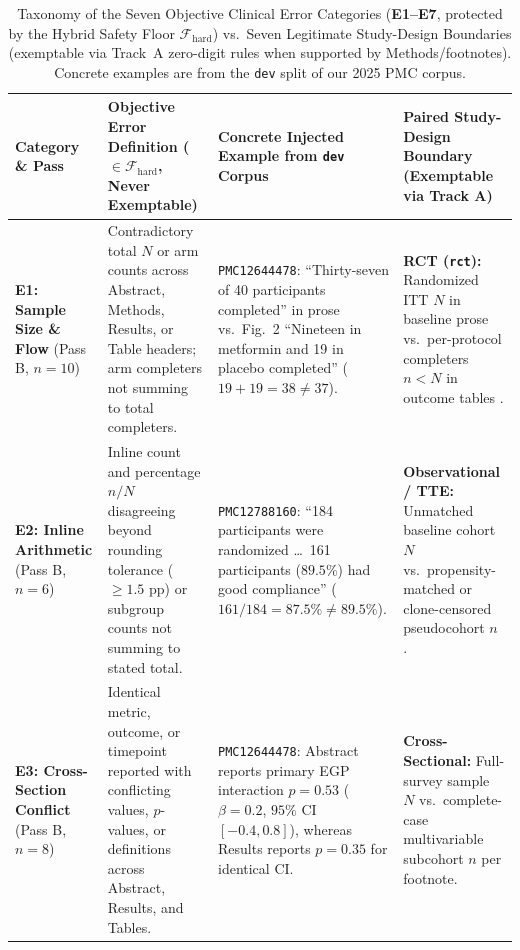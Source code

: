 \documentclass[11pt,a4paper]{article}
\begin{document}
\begin{table}[!t]
\centering
\caption{Taxonomy of the Seven Objective Clinical Error Categories (\textbf{E1--E7}, protected by the Hybrid Safety Floor $\mathcal{F}_{\text{hard}}$) vs.\ Seven Legitimate Study-Design Boundaries (exemptable via Track~A zero-digit rules when supported by Methods/footnotes). Concrete examples are from the \texttt{dev} split of our 2025 PMC corpus.}
\label{tab:taxonomy}
\vspace{2pt}
\scriptsize
\setlength{\tabcolsep}{3.8pt}
\begin{tabularx}{\textwidth}{@{}>{\raggedright\arraybackslash}p{2.25cm}>{\raggedright\arraybackslash}p{4.25cm}>{\raggedright\arraybackslash}X>{\raggedright\arraybackslash}p{3.85cm}@{}}
\toprule
\textbf{Category \& Pass} & \textbf{Objective Error Definition ($\in \mathcal{F}_{\text{hard}}$, Never Exemptable)} & \textbf{Concrete Injected Example from \texttt{dev} Corpus} & \textbf{Paired Study-Design Boundary (Exemptable via Track A)} \\
\midrule
\textbf{E1: Sample Size \& Flow} (Pass B, $n=10$) & Contradictory total $N$ or arm counts across Abstract, Methods, Results, or Table headers; arm completers not summing to total completers. & \texttt{PMC12644478}: ``Thirty-seven of 40 participants completed'' in prose vs.\ Fig.~2 ``Nineteen in metformin and 19 in placebo completed'' ($19+19=38 \neq 37$). & \textbf{RCT (\texttt{rct}):} Randomized ITT $N$ in baseline prose vs.\ per-protocol completers $n < N$ in outcome tables \cite{schulz2010consort}. \\
\addlinespace[2.5pt]
\textbf{E2: Inline Arithmetic} (Pass B, $n=6$) & Inline count and percentage $n/N$ disagreeing beyond rounding tolerance ($\ge 1.5\text{ pp}$) or subgroup counts not summing to stated total. & \texttt{PMC12788160}: ``184 participants were randomized \dots\ 161 participants ($89.5\%$) had good compliance'' ($161/184 = 87.5\% \neq 89.5\%$). & \textbf{Observational / TTE:} Unmatched baseline cohort $N$ vs.\ propensity-matched or clone-censored pseudocohort $n$ \cite{vandenbroucke2007strobe}. \\
\addlinespace[2.5pt]
\textbf{E3: Cross-Section Conflict} (Pass B, $n=8$) & Identical metric, outcome, or timepoint reported with conflicting values, $p$-values, or definitions across Abstract, Results, and Tables. & \texttt{PMC12644478}: Abstract reports primary EGP interaction $p = 0.53$ ($\beta = 0.2$, $95\%$ CI $[-0.4, 0.8]$), whereas Results reports $p = 0.35$ for identical CI. & \textbf{Cross-Sectional:} Full-survey sample $N$ vs.\ complete-case multivariable subcohort $n$ per footnote. \\

\end{tabularx}
\end{table}
\end{document}
